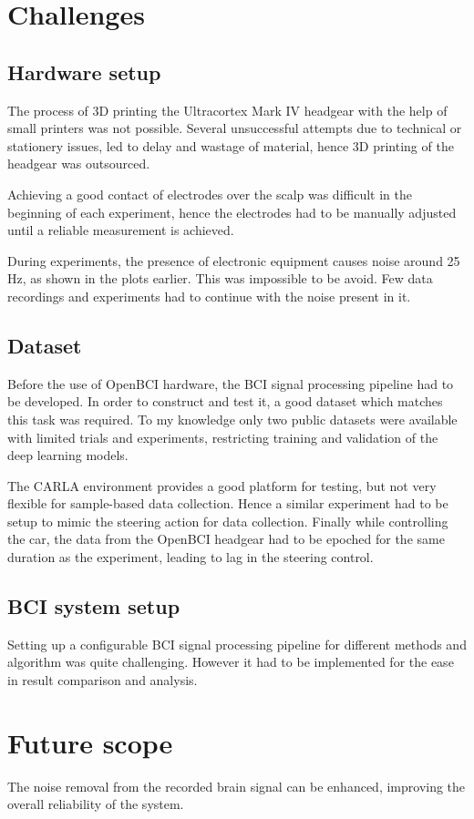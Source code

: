 
\section{Challenges}
\subsection{Hardware setup}
The process of 3D printing the Ultracortex Mark IV headgear with the help of small printers was not possible. Several unsuccessful attempts due to technical or stationery issues, led to delay and wastage of material, hence 3D printing of the headgear was outsourced. 

Achieving a good contact of electrodes over the scalp was difficult in the beginning of each experiment, hence the electrodes had to be manually adjusted until a reliable measurement is achieved. 

During experiments, the presence of electronic equipment causes noise around 25 Hz, as shown in the plots earlier. This was impossible to be avoid. Few data recordings and experiments had to continue with the noise present in it.

\subsection{Dataset}
Before the use of OpenBCI hardware, the BCI signal processing pipeline had to be developed. In order to construct and test it, a good dataset which matches this task was required. To my knowledge only two public datasets were available with limited trials and experiments, restricting training and validation of the deep learning models.

The CARLA environment provides a good platform for testing, but not very flexible for sample-based data collection. Hence a similar experiment had to be setup to mimic the steering action for data collection. Finally while controlling the car, the data from the OpenBCI headgear had to be epoched for the same duration as the experiment, leading to lag in the steering control.

\subsection{BCI system setup}
Setting up a configurable BCI signal processing pipeline for different methods and algorithm was quite challenging. However it had to be implemented for the ease in result comparison and analysis.

\section{Future scope}
The noise removal from the recorded brain signal can be enhanced, improving the overall reliability of the system.

